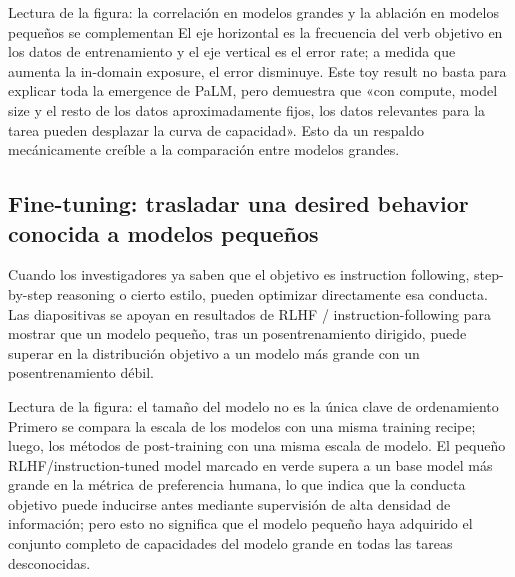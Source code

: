 
\begin{knowledgebox}{Lectura de la figura: la correlación en modelos grandes y la ablación en modelos pequeños se complementan}
El eje horizontal es la frecuencia del verb objetivo en los datos de entrenamiento y el eje vertical es el error rate; a medida que aumenta la in-domain exposure, el error disminuye. Este toy result no basta para explicar toda la emergence de PaLM, pero demuestra que «con compute, model size y el resto de los datos aproximadamente fijos, los datos relevantes para la tarea pueden desplazar la curva de capacidad». Esto da un respaldo mecánicamente creíble a la comparación entre modelos grandes.
\end{knowledgebox}


\subsection{Fine-tuning: trasladar una desired behavior conocida a modelos pequeños}

Cuando los investigadores ya saben que el objetivo es instruction following, step-by-step reasoning o cierto estilo, pueden optimizar directamente esa conducta. Las diapositivas se apoyan en resultados de RLHF / instruction-following para mostrar que un modelo pequeño, tras un posentrenamiento dirigido, puede superar en la distribución objetivo a un modelo más grande con un posentrenamiento débil.


\begin{knowledgebox}{Lectura de la figura: el tamaño del modelo no es la única clave de ordenamiento}
Primero se compara la escala de los modelos con una misma training recipe; luego, los métodos de post-training con una misma escala de modelo. El pequeño RLHF/instruction-tuned model marcado en verde supera a un base model más grande en la métrica de preferencia humana, lo que indica que la conducta objetivo puede inducirse antes mediante supervisión de alta densidad de información; pero esto no significa que el modelo pequeño haya adquirido el conjunto completo de capacidades del modelo grande en todas las tareas desconocidas.
\end{knowledgebox}

